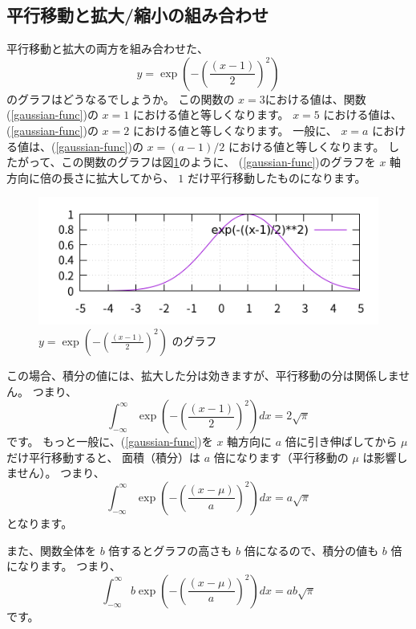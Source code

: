\documentclass[uplatex,dvipdfmx]{jsarticle}
\begin{document}
\subsection{平行移動と拡大/縮小の組み合わせ}
  平行移動と拡大の両方を組み合わせた、
  \[
    y = \exp(-(\frac{(x-1)}{2})^2)
  \]
  のグラフはどうなるでしょうか。
  この関数の $x = 3$における値は、関数(\ref{gaussian-func})の $x = 1$ における値と等しくなります。
  $x = 5$ における値は、(\ref{gaussian-func})の $x = 2$ における値と等しくなります。
  一般に、 $x = a$ における値は、(\ref{gaussian-func})の $x = (a-1)/2$ における値と等しくなります。
  したがって、この関数のグラフは図\ref{gaussian4}のように、
  (\ref{gaussian-func})のグラフを $x$ 軸方向に倍の長さに拡大してから、
  $1$ だけ平行移動したものになります。
  \begin{figure}
    \centering
    \includegraphics[width=15cm]{gaussian4.png}
    \caption{$y = \exp(-(\frac{(x-1)}{2})^2)$ のグラフ}
    \label{gaussian4}
  \end{figure}
  この場合、積分の値には、拡大した分は効きますが、平行移動の分は関係しません。
  つまり、
  \[
    \int_{-\infty}^{\infty} \exp(-(\frac{(x-1)}{2})^2) dx = 2\sqrt{\pi}
  \]
  です。
  もっと一般に、(\ref{gaussian-func})を $x$ 軸方向に $a$ 倍に引き伸ばしてから $\mu$ だけ平行移動すると、
  面積（積分）は $a$ 倍になります（平行移動の $\mu$ は影響しません）。
  つまり、
  \[
    \int_{-\infty}^{\infty} \exp(-(\frac{(x-\mu)}{a})^2) dx = a\sqrt{\pi}
  \]
  となります。

  また、関数全体を $b$ 倍するとグラフの高さも $b$ 倍になるので、積分の値も $b$ 倍になります。
  つまり、
  \begin{equation}
    \label{gaussian-integral-devided-by-b}
    \int_{-\infty}^{\infty} b \exp(-(\frac{(x-\mu)}{a})^2) dx = ab \sqrt{\pi}
  \end{equation}
  です。
\end{document}
